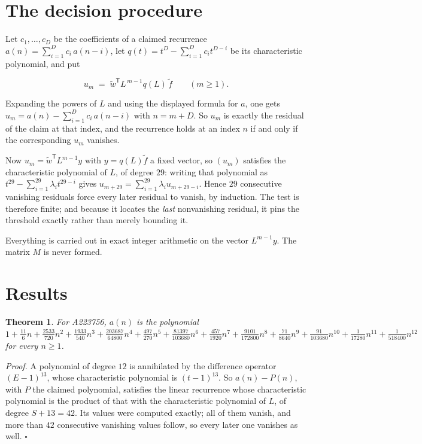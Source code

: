 \documentclass[11pt]{article}
\newtheorem{theorem}{Theorem}
\theoremstyle{definition}
\begin{document}
\section{The decision procedure}

Let $c_1,\dots,c_D$ be the coefficients of a claimed recurrence $a(n) = \sum_{i=1}^{D} c_i\,a(n-i)$, let $q(t) = t^{D} - \sum_{i=1}^{D} c_i t^{D-i}$ be its characteristic polynomial, and put

\[u_m \;=\; \tilde w^{\mathsf T} L^{\,m-1} q(L)\,\tilde f \qquad (m \ge 1).\]

Expanding the powers of $L$ and using the displayed formula for $a$, one gets $u_m = a(n) - \sum_{i=1}^{D} c_i\,a(n-i)$ with $n = m + D$. So $u_m$ is exactly the residual of the claim at that index, and the recurrence holds at an index $n$ if and only if the corresponding $u_m$ vanishes.

Now $u_m = \tilde w^{\mathsf T} L^{m-1} y$ with $y = q(L)\tilde f$ a fixed vector, so $(u_m)$ satisfies the characteristic polynomial of $L$, of degree $29$: writing that polynomial as $t^{29} - \sum_{i=1}^{29} \lambda_i t^{29-i}$ gives $u_{m+29} = \sum_{i=1}^{29} \lambda_i u_{m+29-i}$. Hence $29$ consecutive vanishing residuals force every later residual to vanish, by induction. The test is therefore finite; and because it locates the {\itshape last} nonvanishing residual, it pins the threshold exactly rather than merely bounding it.

Everything is carried out in exact integer arithmetic on the vector $L^{m-1}y$. The matrix $M$ is never formed.

\section{Results}

\begin{theorem} For A223756, $a(n)$ is the polynomial $1 + \frac{11}{6}n + \frac{2533}{720}n^{2} + \frac{1933}{540}n^{3} + \frac{203687}{64800}n^{4} + \frac{497}{270}n^{5} + \frac{81397}{103680}n^{6} + \frac{457}{1920}n^{7} + \frac{9101}{172800}n^{8} + \frac{71}{8640}n^{9} + \frac{91}{103680}n^{10} + \frac{1}{17280}n^{11} + \frac{1}{518400}n^{12}$ for every $n \ge 1$.\end{theorem}

{\itshape Proof.} A polynomial of degree $12$ is annihilated by the difference operator $(E-1)^{13}$, whose characteristic polynomial is $(t-1)^{13}$. So $a(n) - P(n)$, with $P$ the claimed polynomial, satisfies the linear recurrence whose characteristic polynomial is the product of that with the characteristic polynomial of $L$, of degree $S + 13 = 42$. Its values were computed exactly; all of them vanish, and more than $42$ consecutive vanishing values follow, so every later one vanishes as well. $\square$
\end{document}
